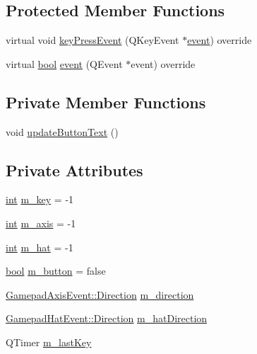 \subsection*{Protected Member Functions}
\begin{DoxyCompactItemize}
\item 
virtual void \mbox{\hyperlink{class_q_g_b_a_1_1_key_editor_a3caf519db651b7658f6c3d589a7ed482}{key\+Press\+Event}} (Q\+Key\+Event $\ast$\mbox{\hyperlink{class_q_g_b_a_1_1_key_editor_ac685742decd6c4140c00110fb1abaca5}{event}}) override
\item 
virtual \mbox{\hyperlink{libretro_8h_a4a26dcae73fb7e1528214a068aca317e}{bool}} \mbox{\hyperlink{class_q_g_b_a_1_1_key_editor_ac685742decd6c4140c00110fb1abaca5}{event}} (Q\+Event $\ast$event) override
\end{DoxyCompactItemize}
\subsection*{Private Member Functions}
\begin{DoxyCompactItemize}
\item 
void \mbox{\hyperlink{class_q_g_b_a_1_1_key_editor_a4c8a2961a38921ab2bbbf0bd3b763614}{update\+Button\+Text}} ()
\end{DoxyCompactItemize}
\subsection*{Private Attributes}
\begin{DoxyCompactItemize}
\item 
\mbox{\hyperlink{ioapi_8h_a787fa3cf048117ba7123753c1e74fcd6}{int}} \mbox{\hyperlink{class_q_g_b_a_1_1_key_editor_a7331c31014fb305eabc777c62ce69ab0}{m\+\_\+key}} = -\/1
\item 
\mbox{\hyperlink{ioapi_8h_a787fa3cf048117ba7123753c1e74fcd6}{int}} \mbox{\hyperlink{class_q_g_b_a_1_1_key_editor_a3ad5284b598c4aa5aa288f62638e72ca}{m\+\_\+axis}} = -\/1
\item 
\mbox{\hyperlink{ioapi_8h_a787fa3cf048117ba7123753c1e74fcd6}{int}} \mbox{\hyperlink{class_q_g_b_a_1_1_key_editor_afeb02bf2b64f633329cd895772bf375d}{m\+\_\+hat}} = -\/1
\item 
\mbox{\hyperlink{libretro_8h_a4a26dcae73fb7e1528214a068aca317e}{bool}} \mbox{\hyperlink{class_q_g_b_a_1_1_key_editor_aeed0f4ab737d18a3a59c204a4c07bbd0}{m\+\_\+button}} = false
\item 
\mbox{\hyperlink{class_q_g_b_a_1_1_gamepad_axis_event_a5d50ab74dce4e58252f2affb5f227bbc}{Gamepad\+Axis\+Event\+::\+Direction}} \mbox{\hyperlink{class_q_g_b_a_1_1_key_editor_a6ce3a95828f346b6c1f7c04a7e69ed10}{m\+\_\+direction}}
\item 
\mbox{\hyperlink{class_q_g_b_a_1_1_gamepad_hat_event_ae3f20662c61b054e5344aafb9d843837}{Gamepad\+Hat\+Event\+::\+Direction}} \mbox{\hyperlink{class_q_g_b_a_1_1_key_editor_a6d4d4430e06e2c6144089f73b2605354}{m\+\_\+hat\+Direction}}
\item 
Q\+Timer \mbox{\hyperlink{class_q_g_b_a_1_1_key_editor_ac2efff715d833a2300d91103e1152624}{m\+\_\+last\+Key}}
\end{DoxyCompactItemize}
